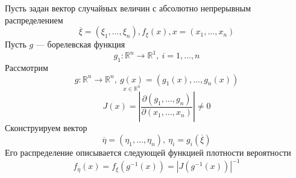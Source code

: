 Пусть задан вектор случайных величин с абсолютно непрерывным распределением
\[
	\overline{\xi} = (\xi_1, \ldots, \xi_n), f_{\xi} (x), x = (x_1, \ldots, x_n)
\]
Пусть $g$ --- борелевская функция
\[
	g_1: \mathbb{R}^n \to \mathbb{R}^1, \ i = 1, \ldots, n
\]
Рассмотрим
\[
	g : \mathbb{R}^n \to \mathbb{R}^n, \ \underset{x \in \mathbb{R}^n}{g(x)} = (g_1(x), \ldots, g_n(x))
\]
\[
	J(x) = \left| \frac{\partial(g_1, \ldots, g_n)}{\partial(x_1, \ldots, x_n)} \right| \neq 0
\]
Сконструируем вектор
\[
	\overline{\eta} = (\eta_1, \ldots, \eta_n), \ \eta_i = g_i (\overline{\xi})
\]
Его распределение описывается следующей функцией плотности вероятности
\[
	f_{\overline{\eta}} (x) = f_{\xi} (g^{-1}(x)) = |J(g^{-1}(x))|^{-1}
\]
